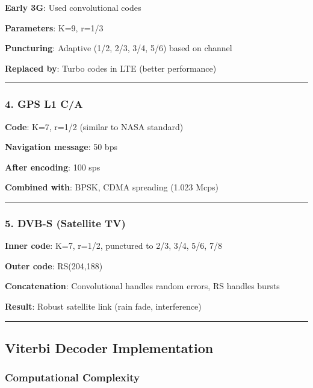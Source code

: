 \textbf{Early 3G}: Used convolutional codes

\textbf{Parameters}: K=9, r=1/3

\textbf{Puncturing}: Adaptive (1/2, 2/3, 3/4, 5/6) based on channel

\textbf{Replaced by}: Turbo codes in LTE (better performance)

\begin{center}\rule{0.5\linewidth}{0.5pt}\end{center}

\subsubsection{4. GPS L1 C/A}\label{gps-l1-ca}

\textbf{Code}: K=7, r=1/2 (similar to NASA standard)

\textbf{Navigation message}: 50 bps

\textbf{After encoding}: 100 sps

\textbf{Combined with}: BPSK, CDMA spreading (1.023 Mcps)

\begin{center}\rule{0.5\linewidth}{0.5pt}\end{center}

\subsubsection{5. DVB-S (Satellite TV)}\label{dvb-s-satellite-tv}

\textbf{Inner code}: K=7, r=1/2, punctured to 2/3, 3/4, 5/6, 7/8

\textbf{Outer code}: RS(204,188)

\textbf{Concatenation}: Convolutional handles random errors, RS handles
bursts

\textbf{Result}: Robust satellite link (rain fade, interference)

\begin{center}\rule{0.5\linewidth}{0.5pt}\end{center}

\subsection{Viterbi Decoder
Implementation}\label{viterbi-decoder-implementation}

\subsubsection{Computational Complexity}\label{computational-complexity}

